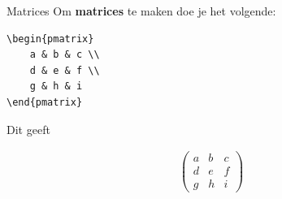 \begin{frame}[fragile]{Matrices}
Om \textbf{matrices} te maken doe je het volgende: 
\pause
\begin{verbatim}
\begin{pmatrix}
    a & b & c \\
    d & e & f \\
    g & h & i
\end{pmatrix}
\end{verbatim}
\pause
Dit geeft 
\begin{tcolorbox}[boxrule=0.5pt, colback=white]
    \begin{align*}
    \begin{pmatrix}
    a & b & c \\
    d & e & f \\
    g & h & i
    \end{pmatrix}
    \end{align*}
\end{tcolorbox}

\end{frame}